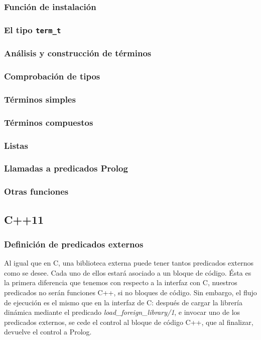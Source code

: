 \documentclass[a4paper,12pt]{article}
\begin{document}
\subsubsection{Función de instalación}
\subsubsection{El tipo \texttt{term\_t}}
\subsubsection{Análisis y construcción de términos}
\subsubsection{Comprobación de tipos}
\subsubsection{Términos simples}
\subsubsection{Términos compuestos}
\subsubsection{Listas}
\subsubsection{Llamadas a predicados Prolog}
\subsubsection{Otras funciones}


\subsection{C++11}
\subsubsection{Definición de predicados externos}
Al igual que en C, una biblioteca externa puede tener tantos predicados externos como se desee. Cada uno de ellos estará asociado a un bloque de código. Ésta es la primera diferencia que tenemos con respecto a la interfaz con C, nuestros predicados no serán funciones C++, si no bloques de código. Sin embargo, el flujo de ejecución es el mismo que en la interfaz de C: después de cargar la librería dinámica mediante el predicado \textit{load\_foreign\_library/1}, e invocar uno de los predicados externos, se cede el control al bloque de código C++, que al finalizar, devuelve el control a Prolog.
\end{document}
